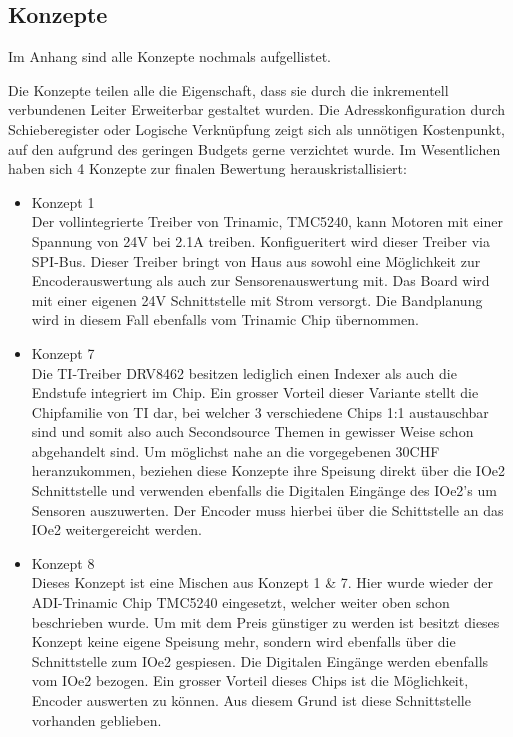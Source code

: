 \documentclass[]{article}
\begin{document}
\subsection{Konzepte}
Im Anhang sind alle Konzepte nochmals aufgellistet. 

Die Konzepte teilen alle die Eigenschaft, dass sie durch die inkrementell verbundenen Leiter Erweiterbar gestaltet wurden. Die Adresskonfiguration durch
Schieberegister oder Logische Verknüpfung zeigt sich als unnötigen Kostenpunkt, auf den aufgrund des geringen Budgets gerne verzichtet wurde. 
Im Wesentlichen haben sich 4 Konzepte zur finalen Bewertung herauskristallisiert:
\begin{itemize}
    \item Konzept 1
    \\ Der vollintegrierte Treiber von Trinamic, TMC5240, kann Motoren mit einer Spannung von 24V bei 2.1A treiben. Konfigueritert wird dieser Treiber
    via SPI-Bus. Dieser Treiber bringt von Haus aus sowohl eine Möglichkeit zur Encoderauswertung als auch zur Sensorenauswertung mit. Das Board wird
    mit einer eigenen 24V Schnittstelle mit Strom versorgt. Die Bandplanung wird in diesem Fall ebenfalls vom Trinamic Chip übernommen.
    \item Konzept 7
    \\ Die TI-Treiber DRV8462 besitzen lediglich einen Indexer als auch die Endstufe integriert im Chip. Ein grosser Vorteil dieser Variante stellt die 
    Chipfamilie von TI dar, bei welcher 3 verschiedene Chips 1:1 austauschbar sind und somit also auch Secondsource Themen in gewisser Weise schon abgehandelt sind.
    Um möglichst nahe an die vorgegebenen 30CHF heranzukommen, beziehen diese Konzepte ihre Speisung direkt über die IOe2 Schnittstelle und verwenden ebenfalls
    die Digitalen Eingänge des IOe2's um Sensoren auszuwerten. Der Encoder muss hierbei über die Schittstelle an das IOe2 weitergereicht werden. 
    \item Konzept 8
    \\ Dieses Konzept ist eine Mischen aus Konzept 1 \& 7. Hier wurde wieder der ADI-Trinamic Chip TMC5240 eingesetzt, welcher weiter oben schon beschrieben wurde.
    Um mit dem Preis günstiger zu werden ist besitzt dieses Konzept keine eigene Speisung mehr, sondern wird ebenfalls über die Schnittstelle zum IOe2 gespiesen. 
    Die Digitalen Eingänge werden ebenfalls vom IOe2 bezogen. Ein grosser Vorteil dieses Chips ist die Möglichkeit, Encoder auswerten zu können. Aus diesem Grund 
    ist diese Schnittstelle vorhanden geblieben. 
\end{itemize}
\end{document}
